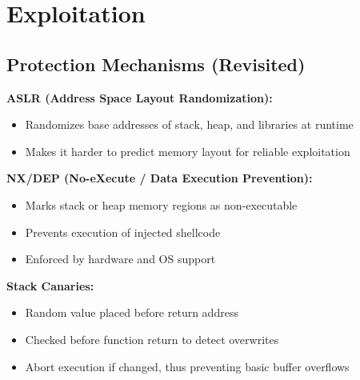 \section{Exploitation}


\subsection{Protection Mechanisms (Revisited)}
{
  \textbf{ASLR (Address Space Layout Randomization):}
  \begin{itemize}[noitemsep]
    \item Randomizes base addresses of stack, heap, and libraries at runtime
    \item Makes it harder to predict memory layout for reliable exploitation
  \end{itemize}
  
  \item \textbf{NX/DEP (No-eXecute / Data Execution Prevention):}
  \begin{itemize}[noitemsep]
    \item Marks stack or heap memory regions as non-executable
    \item Prevents execution of injected shellcode
    \item Enforced by hardware and OS support
  \end{itemize}
  
  \item \textbf{Stack Canaries:}
  \begin{itemize}[noitemsep]
    \item Random value placed before return address
    \item Checked before function return to detect overwrites
    \item Abort execution if changed, thus preventing basic buffer overflows
  \end{itemize}
}

